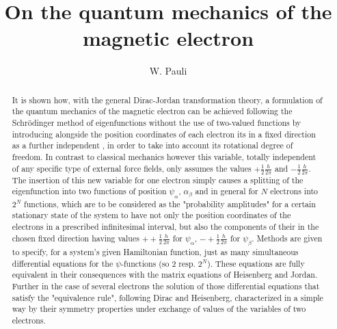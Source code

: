 \begin{paper}{1}
\newcommand{\spin}{+\frac{1}{2}\frac{h}{2\pi}}
\begin{header}
\title{On the quantum mechanics of the magnetic electron}
\author{W. Pauli}
\makeheader
\end{header}

\begin{abstract}
It is shown how,  with the general Dirac-Jordan transformation theory, a formulation of the quantum mechanics of the magnetic electron can be achieved following the Schr\"odinger method of eigenfunctions without the use of two-valued functions by introducing alongside the position coordinates of each electron its  in a fixed direction as a further independent , in order to take into account its rotational degree of freedom. In contrast to classical mechanics however this variable, totally independent of any specific type of external force fields, only assumes the values $+\frac{1}{2}\frac{h}{2\pi}$ and $-\frac{1}{2}\frac{h}{2\pi}$. The insertion of this new variable for one electron simply causes a splitting of the eigenfunction into two functions of position $\psi_\alpha$, $\alpha_\beta$ and in general for $N$ electrons into $2^N$ functions, which are to be considered as the "probability amplitudes" for a certain stationary state of the system to have not only the position coordinates of the electrons in a prescribed infinitesimal interval, but also the components of their  in the chosen fixed direction having values $+\spin$ for $\psi_\alpha$, $-\spin$ for $\psi_\beta$. Methods are given to specify, for a system's given Hamiltonian function, just as many simultaneous differential equations for the $\psi$-functions  (so 2 resp. $2^N$). These equations are fully equivalent in their consequences with the matrix equations of Heisenberg and Jordan. Further in the case of several electrons the solution of those differential equations that satisfy the "equivalence rule", following Dirac and Heisenberg, characterized in a simple way by their symmetry properties under exchange of values of the variables of two electrons.
\end{abstract}


\end{paper}

